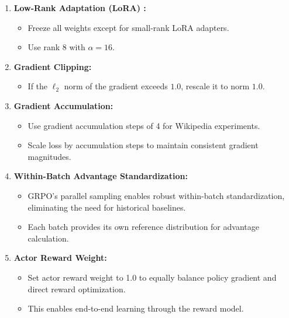 \documentclass{article} %
\begin{document}
\begin{enumerate}
    \item \textbf{Low-Rank Adaptation (LoRA) \citep{hu2022lora}:} 
    \begin{itemize}
        \item Freeze all weights except for small-rank LoRA adapters.
        \item Use rank 8 with $\alpha = 16$.
    \end{itemize}

    \item \textbf{Gradient Clipping:} 
    \begin{itemize}
        \item If the $\ell_2$ norm of the gradient exceeds $1.0$, rescale it to norm $1.0$.
    \end{itemize}

    \item \textbf{Gradient Accumulation:} 
    \begin{itemize}
        \item Use gradient accumulation steps of 4 for Wikipedia experiments.
        \item Scale loss by accumulation steps to maintain consistent gradient magnitudes.
    \end{itemize}

    \item \textbf{Within-Batch Advantage Standardization:} 
    \begin{itemize}
        \item GRPO's parallel sampling enables robust within-batch standardization, eliminating the need for historical baselines.
        \item Each batch provides its own reference distribution for advantage calculation.
    \end{itemize}

    \item \textbf{Actor Reward Weight:} 
    \begin{itemize}
        \item Set actor reward weight to 1.0 to equally balance policy gradient and direct reward optimization.
        \item This enables end-to-end learning through the reward model.
    \end{itemize}


\end{enumerate}
\end{document}
